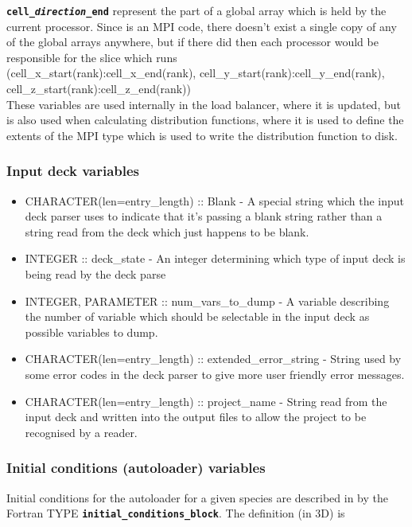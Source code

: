 \documentclass[12pt,a4paper]{article}
\newcommand{\inlinecode}[1]{{\color{warwickred} \bf\texttt{#1}}}
\newcommand{\EPOCH}{{\color{warwickdark}\fontfamily{phv}\selectfont{EPOCH}}}
\begin{document}
\inlinecode{cell\_{\it direction}\_end} represent the part of a global array
which is held by the current processor. Since {\EPOCH} is an MPI code, there
doesn't exist a single copy of any of the global arrays anywhere, but if there
did then each processor would be responsible for the slice which runs\\
(cell\_x\_start(rank):cell\_x\_end(rank),
cell\_y\_start(rank):cell\_y\_end(rank),
cell\_z\_start(rank):cell\_z\_end(rank))\\
These variables are used internally in the load balancer, where it is updated,
but is also used when calculating distribution functions, where it is used to
define the extents of the MPI type which is used to write the distribution
function to disk.

\subsubsection{Input deck variables}
\begin{itemize}
\item CHARACTER(len=entry\_length) :: Blank - A special string which the input
  deck parser uses to indicate that it's passing a blank string rather than a
  string read from the deck which just happens to be blank.
\item INTEGER :: deck\_state - An integer determining which type of input deck
  is being read by the deck parse
\item INTEGER, PARAMETER :: num\_vars\_to\_dump - A variable describing the
  number of variable which should be selectable in the input deck as possible
  variables to dump.
\item CHARACTER(len=entry\_length) :: extended\_error\_string - String used by
  some error codes in the deck parser to give more user friendly error
  messages.
\item CHARACTER(len=entry\_length) :: project\_name - String read from the
  input deck and written into the output files to allow the project to be
  recognised by a reader.
\end{itemize}

\subsubsection{Initial conditions (autoloader) variables}
Initial conditions for the autoloader for a given species are described in
{\EPOCH} by the Fortran TYPE \inlinecode{initial\_conditions\_block}. The
definition (in 3D) is
\end{document}
